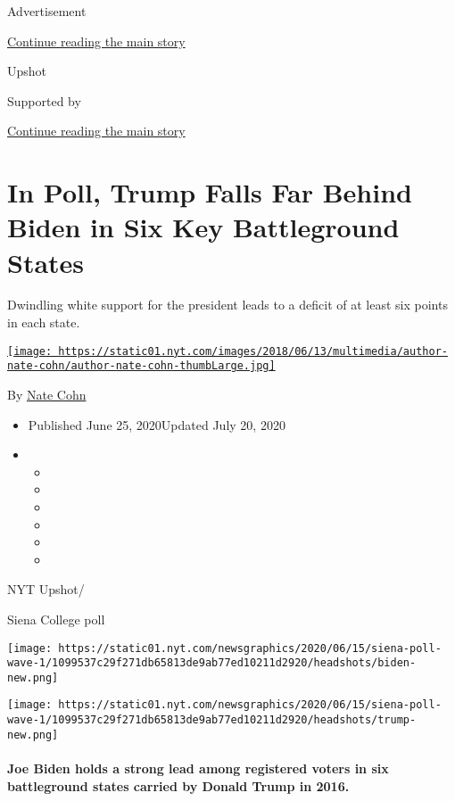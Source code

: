 Advertisement

\protect\hyperlink{after-top}{Continue reading the main story}

Upshot

Supported by

\protect\hyperlink{after-sponsor}{Continue reading the main story}

\hypertarget{in-poll-trump-falls-far-behind-biden-in-six-key-battleground-states}{%
\section{In Poll, Trump Falls Far Behind Biden in Six Key Battleground
States}\label{in-poll-trump-falls-far-behind-biden-in-six-key-battleground-states}}

Dwindling white support for the president leads to a deficit of at least
six points in each state.

\href{https://www.nytimes.com/by/nate-cohn}{\texttt{[image: https://static01.nyt.com/images/2018/06/13/multimedia/author-nate-cohn/author-nate-cohn-thumbLarge.jpg]}}

By \href{https://www.nytimes.com/by/nate-cohn}{Nate Cohn}

\begin{itemize}
\item
  Published June 25, 2020Updated July 20, 2020
\item
  \begin{itemize}
  \item
  \item
  \item
  \item
  \item
  \item
  \end{itemize}
\end{itemize}

NYT Upshot/

Siena College poll

\texttt{[image: https://static01.nyt.com/newsgraphics/2020/06/15/siena-poll-wave-1/1099537c29f271db65813de9ab77ed10211d2920/headshots/biden-new.png]}

\texttt{[image: https://static01.nyt.com/newsgraphics/2020/06/15/siena-poll-wave-1/1099537c29f271db65813de9ab77ed10211d2920/headshots/trump-new.png]}

\hypertarget{joe-biden-holds-a-strong-lead-among-registered-voters-in-six-battleground-states-carried-by-donald-trump-in-2016}{%
\paragraph{Joe Biden holds a strong lead among registered voters in six
battleground states carried by Donald Trump in
2016.}\label{joe-biden-holds-a-strong-lead-among-registered-voters-in-six-battleground-states-carried-by-donald-trump-in-2016}}

